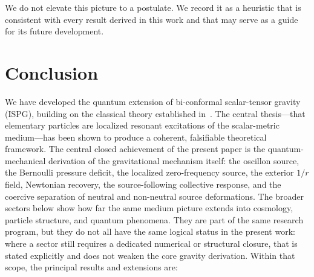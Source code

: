 \documentclass[aps,prd,onecolumn,superscriptaddress,nofootinbib,showpacs,12pt,notitlepage]{revtex4-2}
\begin{document}
We do not elevate this picture to a postulate.  We record it
as a heuristic that is consistent with every result derived
in this work and that may serve as a guide for its future
development.

\section{Conclusion}\label{sec:conclusion}

We have developed the quantum extension of bi-conformal
scalar-tensor gravity (ISPG), building on the classical
theory established in~\cite{Lotishvili2026}.  The central
thesis---that elementary particles are localized resonant
excitations of the scalar-metric medium---has been shown
to produce a coherent, falsifiable theoretical framework.
The central closed achievement of the present paper is the
quantum-mechanical derivation of the gravitational mechanism itself:
the oscillon source, the Bernoulli pressure deficit, the localized
zero-frequency source, the exterior $1/r$ field, Newtonian recovery,
the source-following collective response, and the coercive separation
of neutral and non-neutral source deformations.  The broader sectors
below show how far the same medium picture extends into cosmology,
particle structure, and quantum phenomena.  They are part of the same
research program, but they do not all have the same logical status in
the present work: where a sector still requires a dedicated numerical
or structural closure, that is stated explicitly and does not weaken
the core gravity derivation.  Within that scope, the principal
results and extensions are:
\end{document}
